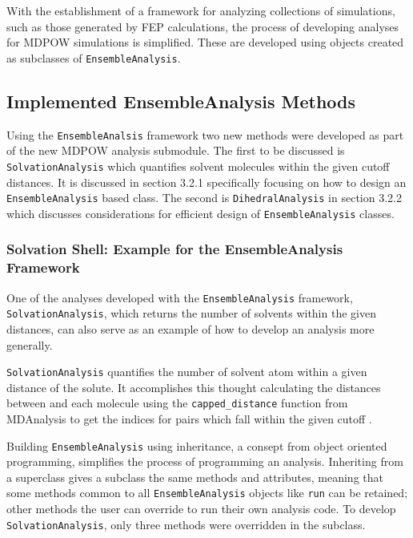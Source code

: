 \documentclass{article}[letterpaper, margins=1in, 12pt]
\begin{document}
With the establishment of a framework for analyzing collections of simulations, such as those generated by FEP calculations, the process of developing analyses for MDPOW simulations is simplified. These are developed using objects created as subclasses of \texttt{EnsembleAnalysis}.

\subsection{Implemented EnsembleAnalysis Methods}
Using the \texttt{EnsembleAnalsis} framework two new methods were developed as part of the new MDPOW analysis submodule. The first to be discussed is \texttt{SolvationAnalysis} which quantifies solvent molecules within the given cutoff distances. It is discussed in section 3.2.1 specifically focusing on how to design an \texttt{EnsembleAnalysis} based class. The second is \texttt{DihedralAnalysis} in section 3.2.2 which discusses considerations for efficient design of \texttt{EnsembleAnalysis} classes.

\subsubsection{Solvation Shell: Example for the EnsembleAnalysis Framework}

One of the analyses developed with the \texttt{EnsembleAnalysis} framework, \texttt{SolvationAnalysis}, which returns the number of solvents within the given distances, can also serve as an example of how to develop an analysis more generally. 

\texttt{SolvationAnalysis} quantifies the number of solvent atom within a given distance of the solute. It accomplishes this thought calculating the distances between and each molecule using the \lstinline{capped_distance} function from MDAnalysis to get the indices for pairs which fall within the given cutoff \cite{michaud-agrawal_mdanalysis_2011, gowers_mdanalysis_2016}. 

Building \texttt{EnsembleAnalysis} using inheritance, a consept from object oriented programming, simplifies the process of programming an analysis. Inheriting from a superclass gives a subclass the same methods and attributes, meaning that some methods common to all \texttt{EnsembleAnalysis} objects like \lstinline{run} can be retained; other methods the user can override to run their own analysis code. To develop \texttt{SolvationAnalysis}, only three methods were overridden in the subclass.  
 
\end{document}
